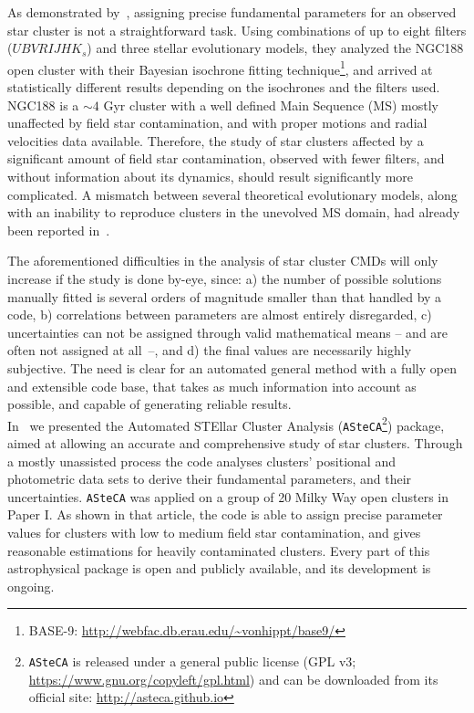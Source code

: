 \documentclass{aa}
\begin{document}
As demonstrated by~\cite{Hills_2015}, assigning precise fundamental
parameters for an observed star cluster is not a straightforward task.
Using combinations of up to eight filters ($UBVRIJHK_s$) and three stellar
evolutionary models, they analyzed the NGC188 open cluster with their
Bayesian isochrone fitting technique\footnote{BASE-9: 
\url{http://webfac.db.erau.edu/~vonhippt/base9/}}, and arrived at statistically
different results depending on the isochrones and the filters used.
%
NGC188 is a ${\sim}4$ Gyr cluster with a well defined Main Sequence (MS) mostly
unaffected by field star contamination, and with proper motions and radial
velocities data available.
Therefore, the study of star clusters affected by a significant amount of field
star contamination, observed with fewer filters, and without information about
its dynamics, should result significantly more complicated.
%
A mismatch between several theoretical evolutionary models, along with an
inability to reproduce clusters in the unevolved MS domain, had already
been reported in~\cite{Grocholski_2003}.

The aforementioned difficulties in the analysis of star cluster CMDs will only
increase if the study is done by-eye, since: a) the number of possible solutions
manually fitted is several orders of magnitude smaller than that handled by a
code, b) correlations between parameters are almost entirely disregarded, c)
uncertainties can not be assigned through valid mathematical
means -- and are often not assigned at \mbox{all --}, and d) the final values
are necessarily highly subjective.
%
The need is clear for an automated general method with a fully open and
extensible code base, that takes as much information into account as possible,
and capable of generating reliable results.\\

In~\citet[][hereafter Paper I]{Perren_2015} we presented the Automated STEllar
Cluster Analysis (\texttt{ASteCA}\footnote{\texttt{ASteCA} is released under a
general public license (GPL v3; \url{https://www.gnu.org/copyleft/gpl.html}) and
can be downloaded from its official site: \url{http://asteca.github.io}})
package, aimed at allowing an accurate and comprehensive study of star clusters.
%
Through a mostly unassisted process the code analyses clusters' positional
and photometric data sets to derive their fundamental parameters, and their
uncertainties.
\texttt{ASteCA} was applied on a group of 20 Milky Way open clusters
in Paper I. As shown in that article, the code is able to assign precise
parameter values for clusters with low to medium field star contamination, and
gives reasonable estimations for heavily contaminated clusters.
Every part of this astrophysical package is open and publicly available, and its
development is ongoing.
\end{document}
